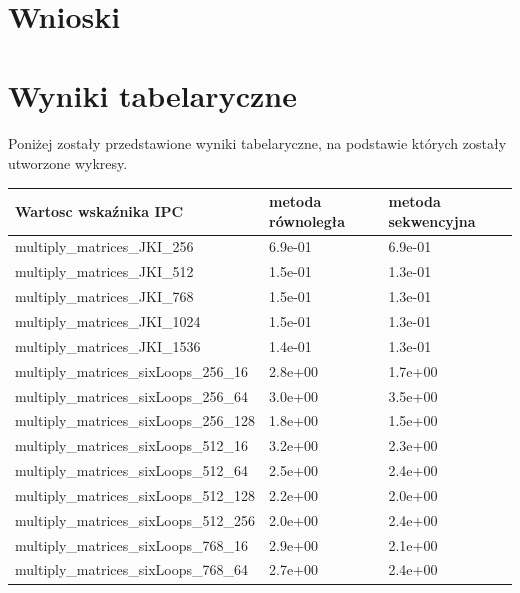 \documentclass{scrartcl}
\begin{document}
\section{Wnioski}
\section{Wyniki tabelaryczne}
\paragraph{} Poniżej zostały przedstawione wyniki tabelaryczne, na podstawie których zostały utworzone wykresy.
\begin{table}[H]
\begin{tabular}{|l|l|l|}
\hline
Wartosc wskaźnika IPC         & metoda równoległa & metoda sekwencyjna \\ \hline
multiply\_matrices\_JKI\_256  & 6.9e-01           & 6.9e-01            \\ \hline
multiply\_matrices\_JKI\_512  & 1.5e-01           & 1.3e-01            \\ \hline
multiply\_matrices\_JKI\_768  & 1.5e-01           & 1.3e-01            \\ \hline
multiply\_matrices\_JKI\_1024 & 1.5e-01           & 1.3e-01            \\ \hline
multiply\_matrices\_JKI\_1536 & 1.4e-01           & 1.3e-01            \\ \hline
multiply\_matrices\_sixLoops\_256\_16   & 2.8e+00           & 1.7e+00            \\ \hline
multiply\_matrices\_sixLoops\_256\_64   & 3.0e+00           & 3.5e+00            \\ \hline
multiply\_matrices\_sixLoops\_256\_128  & 1.8e+00           & 1.5e+00            \\ \hline
multiply\_matrices\_sixLoops\_512\_16   & 3.2e+00           & 2.3e+00            \\ \hline
multiply\_matrices\_sixLoops\_512\_64   & 2.5e+00           & 2.4e+00            \\ \hline
multiply\_matrices\_sixLoops\_512\_128  & 2.2e+00           & 2.0e+00            \\ \hline
multiply\_matrices\_sixLoops\_512\_256  & 2.0e+00           & 2.4e+00            \\ \hline
multiply\_matrices\_sixLoops\_768\_16   & 2.9e+00           & 2.1e+00            \\ \hline
multiply\_matrices\_sixLoops\_768\_64   & 2.7e+00           & 2.4e+00            \\ \hline

\end{tabular}
\end{table}
\end{document}
